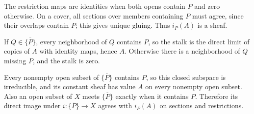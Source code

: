 The restriction maps are identities when both opens contain $P$ and zero otherwise. On a cover, all sections over members containing $P$ must agree, since their overlaps contain $P$; this gives unique gluing. Thus $i_P(A)$ is a sheaf.

If $Q\in\overline{\{P\}}$, every neighborhood of $Q$ contains $P$, so the stalk is the direct limit of copies of $A$ with identity maps, hence $A$. Otherwise there is a neighborhood of $Q$ missing $P$, and the stalk is zero.

Every nonempty open subset of $\overline{\{P\}}$ contains $P$, so this closed subspace is irreducible, and its constant sheaf has value $A$ on every nonempty open subset. Also an open subset of $X$ meets $\overline{\{P\}}$ exactly when it contains $P$. Therefore its direct image under $i:\overline{\{P\}}\to X$ agrees with $i_P(A)$ on sections and restrictions.
